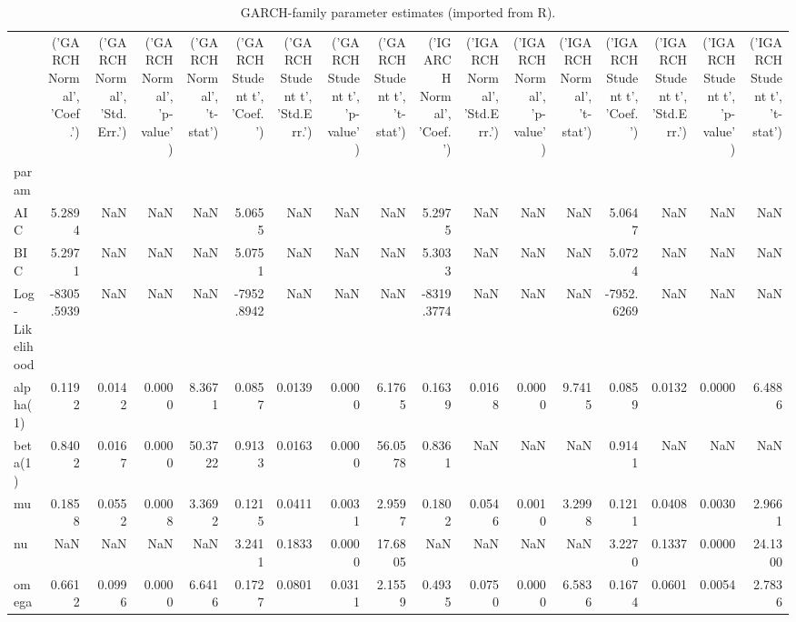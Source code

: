 \begin{table}[htbp]
\centering
\begin{tabular}{lrrrrrrrrrrrrrrrr}
\toprule
 & ('GARCH Normal', 'Coef.') & ('GARCH Normal', 'Std.Err.') & ('GARCH Normal', 'p-value') & ('GARCH Normal', 't-stat') & ('GARCH Student t', 'Coef.') & ('GARCH Student t', 'Std.Err.') & ('GARCH Student t', 'p-value') & ('GARCH Student t', 't-stat') & ('IGARCH Normal', 'Coef.') & ('IGARCH Normal', 'Std.Err.') & ('IGARCH Normal', 'p-value') & ('IGARCH Normal', 't-stat') & ('IGARCH Student t', 'Coef.') & ('IGARCH Student t', 'Std.Err.') & ('IGARCH Student t', 'p-value') & ('IGARCH Student t', 't-stat') \\
param &  &  &  &  &  &  &  &  &  &  &  &  &  &  &  &  \\
\midrule
AIC & 5.2894 & NaN & NaN & NaN & 5.0655 & NaN & NaN & NaN & 5.2975 & NaN & NaN & NaN & 5.0647 & NaN & NaN & NaN \\
BIC & 5.2971 & NaN & NaN & NaN & 5.0751 & NaN & NaN & NaN & 5.3033 & NaN & NaN & NaN & 5.0724 & NaN & NaN & NaN \\
Log-Likelihood & -8305.5939 & NaN & NaN & NaN & -7952.8942 & NaN & NaN & NaN & -8319.3774 & NaN & NaN & NaN & -7952.6269 & NaN & NaN & NaN \\
alpha(1) & 0.1192 & 0.0142 & 0.0000 & 8.3671 & 0.0857 & 0.0139 & 0.0000 & 6.1765 & 0.1639 & 0.0168 & 0.0000 & 9.7415 & 0.0859 & 0.0132 & 0.0000 & 6.4886 \\
beta(1) & 0.8402 & 0.0167 & 0.0000 & 50.3722 & 0.9133 & 0.0163 & 0.0000 & 56.0578 & 0.8361 & NaN & NaN & NaN & 0.9141 & NaN & NaN & NaN \\
mu & 0.1858 & 0.0552 & 0.0008 & 3.3692 & 0.1215 & 0.0411 & 0.0031 & 2.9597 & 0.1802 & 0.0546 & 0.0010 & 3.2998 & 0.1211 & 0.0408 & 0.0030 & 2.9661 \\
nu & NaN & NaN & NaN & NaN & 3.2411 & 0.1833 & 0.0000 & 17.6805 & NaN & NaN & NaN & NaN & 3.2270 & 0.1337 & 0.0000 & 24.1300 \\
omega & 0.6612 & 0.0996 & 0.0000 & 6.6416 & 0.1727 & 0.0801 & 0.0311 & 2.1559 & 0.4935 & 0.0750 & 0.0000 & 6.5836 & 0.1674 & 0.0601 & 0.0054 & 2.7836 \\
\bottomrule
\end{tabular}
\caption{GARCH-family parameter estimates (imported from R).}
\label{tab:garch_family_params}
\end{table}
